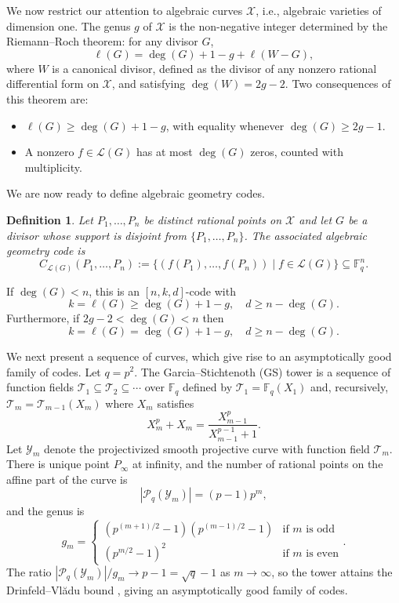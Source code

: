\documentclass[draft, onecolumn, 11pt]{IEEEtran}
\newtheorem{definition}[theorem]{Definition}
\newcommand{\F}{\mathbb{F}}
\begin{document}
We now restrict our attention to algebraic curves $\mathcal{X}$, i.e., algebraic varieties of dimension one.
The genus $g$ of $\mathcal{X}$ is the non-negative integer determined by the Riemann--Roch theorem: for any divisor $G$,
$$
\ell(G) = \deg(G) + 1 - g + \ell(W - G),
$$
where $W$ is a canonical divisor, defined as the divisor of any nonzero rational differential form on $\mathcal{X}$, and satisfying $\deg(W) = 2g - 2$. Two consequences of this theorem are:
\begin{itemize}
    \item $\ell(G) \geq \deg(G) + 1 - g$, with equality whenever $\deg(G) \geq 2g - 1$.
    \item A nonzero $f \in \mathcal{L}(G)$ has at most $\deg(G)$ zeros, counted with multiplicity.
\end{itemize}
We are now ready to define algebraic geometry codes. 
\begin{definition}
    Let $P_1, \dots, P_n$ be distinct rational points on $\mathcal{X}$ and let $G$ be a divisor whose support is disjoint from $\{P_1, \dots, P_n\}$.  The associated algebraic geometry code is
$$
C_{\mathcal{L}(G)}(P_1, \dots, P_n) := \{(f(P_1), \dots, f(P_n)) \mid f \in \mathcal{L}(G)\} \subseteq \F_q^n.
$$
\end{definition}
If $\deg(G) < n$, this is an $[n, k, d]$-code with
$$
k = \ell(G) \geq \deg(G) + 1 - g, \quad d \geq n - \deg(G).
$$
Furthermore, if $2g - 2 < \deg(G) < n$ then
$$
k = \ell(G) = \deg(G) + 1 - g, \quad d \geq n - \deg(G).
$$

We next present a sequence of curves, which give rise to an asymptotically good family of codes.
Let $q = p^2$. The Garcia--Stichtenoth (GS) tower \cite{garcia1996asymptotic} is a sequence of function fields $\mathcal{T}_1 \subseteq \mathcal{T}_2 \subseteq \cdots$ over $\F_q$ defined by $\mathcal{T}_1 = \F_q(X_1)$ and, recursively, $\mathcal{T}_m = \mathcal{T}_{m-1}(X_m)$ where $X_m$ satisfies
$$X_m^p + X_m = \frac{X_{m-1}^p}{X_{m-1}^{p-1} + 1}.$$
Let $\mathcal{Y}_m$ denote the projectivized smooth projective curve with function field $\mathcal{T}_m$. There is unique point $P_\infty$ at infinity, and the number of rational points on the affine part of the curve is 
$$|\mathcal{P}_q(\mathcal{Y}_m) | = (p - 1) p^{m},$$
and the genus is 
$$g_m = \begin{cases} (p^{(m+1)/2} - 1)(p^{(m-1)/2} - 1) & \text{if $m$ is odd} \\ (p^{m/2} - 1)^2 & \text{if $m$ is even} \end{cases}.$$
The ratio $|\mathcal{P}_q(\mathcal{Y}_m)|/g_m \to p - 1 = \sqrt{q} - 1$ as $m \to \infty$, so the tower attains the Drinfeld--Vl\u{a}du  bound \cite{vladut1983bound}, giving an asymptotically good family of codes.
\end{document}
